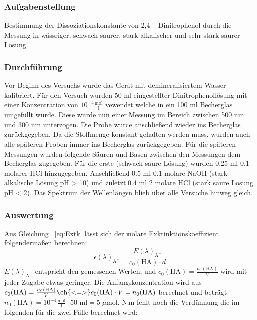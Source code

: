 \documentclass{scrartcl}
\begin{document}
\subsubsection{Aufgabenstellung}
Bestimmung der Dissoziationskonstante von 2,4 – Dinitrophenol durch die Messung in wässriger, schwach saurer, stark alkalischer und sehr stark saurer Lösung. 
\subsubsection{Durchführung}
Vor Beginn des Versuchs wurde das Gerät mit demineralisiertem Wasser kalibriert.  Für den Versuch wurden 50 ml eingestellter Dinitrophenollösung mit einer Konzentration von $10^{-4} \frac{\text{mol}}{\text{l}}$ vewendet welche in ein 100 ml Becherglas umgefüllt wurde. Diese wurde nun einer Messung im Bereich zwischen 500 nm und 300 nm unterzogen. Die Probe wurde anschließend wieder ins Becherglas zurückgegeben. Da die Stoffmenge konstant gehalten werden muss, wurden auch alle späteren Proben immer ins Becherglas zurückgegeben. Für die späteren Messungen wurden folgende Säuren und Basen zwischen den Messungen dem Becherglas zugegeben. Für die erste (schwach saure Lösung) wurden 0,25 ml 0.1 molarer HCl hinzugegeben. Anschließend 0.5 ml 0.1 molare NaOH (stark alkalische Lösung pH > 10) und zuletzt 0.4 ml 2 molare HCl (stark saure Lösung pH < 2). Das Spektrum der Wellenlängen blieb über alle Versuche hinweg gleich.

\subsubsection{Auswertung}
Aus Gleichung ~\ref{eq:Extk} lässt sich der molare Exktinktionskoeffizient folgendermaßen berechnen:
\begin{equation}
	\epsilon(\lambda)_{\text{A}^-} = \frac{E(\lambda)_{\text{A}^-}}{c_0(\text{HA})\cdot d}
\end{equation}
$E(\lambda)_{\text{A}^-}$ entspricht den gemessenen Werten, und $c_0(\text{HA})=\frac{n_0(\text{HA})}{V}$ wird mit jeder Zugabe etwas geringer. Die Anfangskonzentration wird aus $c_0(\text{HA})=\frac{n_0(\text{HA})}{V} \ch{<=>} c_0(\text{HA})\cdot V = n_0(\text{HA})$ berechnet und beträgt $n_0(\text{HA}) = 10^{-4} \frac{\text{mol}}{\text{l}}\cdot 50 \text{ ml} = 5\;\mu \text{mol}$. Nun fehlt noch die Verdünnung die im folgenden für die zwei Fälle berechnet wird:
\end{document}
